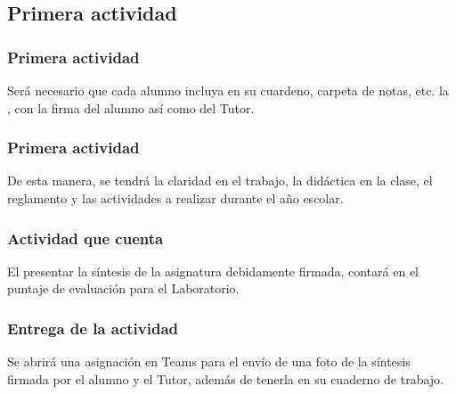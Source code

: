 \documentclass[14pt]{beamer}
\begin{document}

\subsection{Primera actividad}

\begin{frame}
\frametitle{Primera actividad}
Será necesario que cada alumno incluya en su cuardeno, carpeta de notas, etc. la , con la firma del alumno así como del Tutor.
\end{frame}
\begin{frame}
\frametitle{Primera actividad}
De esta manera, se tendrá la claridad en el trabajo, la didáctica en la clase, el reglamento y las actividades a realizar durante el año escolar.
\end{frame}
\begin{frame}
\frametitle{Actividad que cuenta}
El presentar la síntesis de la asignatura debidamente firmada, contará en el puntaje de evaluación para el Laboratorio.
\end{frame}
\begin{frame}
\frametitle{Entrega de la actividad}
Se abrirá una asignación en Teams para el envío de una foto de la síntesis firmada por el alumno y el Tutor, además de tenerla en su cuaderno de trabajo.
\end{frame}
\end{document}
